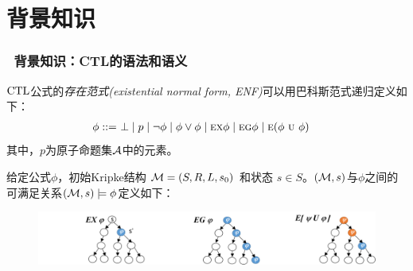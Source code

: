 \documentclass[aspectratio=1610, 9pt, CJK]{beamer}
\begin{document}
\section{背景知识}
\begin{frame} 
	\frametitle{~背景知识：CTL的语法和语义}
		\begin{definition}
			$\textrm{CTL}$公式的\emph{存在范式(existential normal form, ENF)}可以用巴科斯范式递归定义如下：
			\begin{align*}
				\phi  ::= & \  \bot %
				\mid p \mid\neg\phi \mid \phi\lor\phi \mid
				\EXIST \NEXT \phi \mid
				\EXIST \GLOBAL \phi \mid 
				\EXIST (\phi\ \UNTILL\ \phi)
			\end{align*}
			其中，$p$为原子命题集${\cal A}$中的元素。%
		\end{definition} 
		\begin{definition}\label{def:ctl:semantic}
			给定公式$\phi$，初始Kripke结构 ${\cal M}=(S,R,L,s_0)$ 和状态 $s\in S$。$({\cal M},s)$与$\phi$之间的可满足关系$({\cal M},s)\models \phi$定义如下：
			\begin{figure}
				\includegraphics[scale=0.3]{figures/semanticCTL1}
			\end{figure}
		\end{definition} 
\end{frame}
\end{document}
